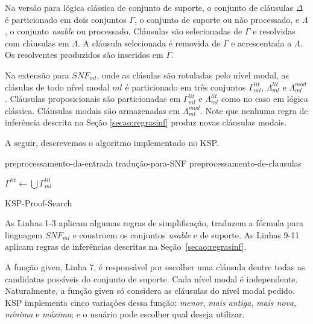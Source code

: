 Na versão para lógica clássica de conjunto de suporte, o conjunto de cláusulas $\Delta$ é particionado em dois conjuntos $\Gamma$, o conjunto de suporte ou não processado, e $\Lambda$, o conjunto \textit{usable} ou processado. Cláusulas são selecionadas de $\Gamma$ e resolvidas com cláusulas em $\Lambda$. A cláusula selecionada é removida de $\Gamma$ e acrescentada a $\Lambda$. Os resolventes produzidos são inseridos em $\Gamma$.

Na extensão para $SNF_{ml}$, onde as clásulas são rotuladas pelo nível modal, as clásulas de todo nível modal $ml$ é particionado em três conjuntos $\Gamma^{lit}_{ml}$, $\Lambda^{lit}_{ml}$ e $\Lambda^{mod}_{ml}$. Cláusulas proposicionais são particionadas em $\Gamma^{lit}_{ml}$ e $\Lambda^{lit}_{ml}$ como no caso em lógica clássica. Cláusulas modais são armazenadas em $\Lambda^{mod}_{ml}$. Note que nenhuma regra de inferência descrita na Seção \ref{secao:regrasinf} produz novas cláusulas modais.

A seguir, descrevemos o algoritmo implementado no KSP.

\begin{algorithm}[H]
	\SetAlgoLined
	preprocessamento-da-entrada\;
	tradução-para-SNF\;
	preprocessamento-de-clausulas\;

	$\Gamma^{lit} \leftarrow \bigcup \Gamma^{lit}_{ml}$\;
	\caption{KSP-Proof-Search}
\end{algorithm}

As Linhas 1-3 aplicam algumas regras de simplificação, traduzem a fórmula para linguagem $SNF_{ml}$ e constroem os conjuntos \textit{usable} e de suporte. As Linhas 9-11 aplicam regras de inferências descritas na Seção~\ref{secao:regrasinf}.

A função {\sf given}, Linha 7, é responsável por escolher uma cláusula dentre todas as candidatas possíveis do conjunto de suporte. Cada nível modal é independente. Naturalmente, a função {\sf given} só considera as cláusulas do nível modal pedido. KSP implementa cinco variações dessa função: \textit{menor}, \textit{mais antiga}, \textit{mais nova}, \textit{mínima} e \textit{máxima}; e o usuário pode escolher qual deseja utilizar.

